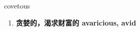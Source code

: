 
\begin{frame}
{\huge covetous}
\begin{center}
\begin{enumerate}\Large
  \item \textbf{贪婪的，渴求财富的 avaricious, avid}
\end{enumerate}
\end{center}
\end{frame}
